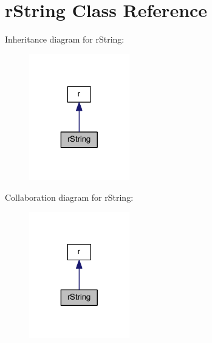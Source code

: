 \hypertarget{class_pierce_moore_1_1_ruby_p_h_p_1_1r_string}{\section{r\-String Class Reference}
\label{class_pierce_moore_1_1_ruby_p_h_p_1_1r_string}
}


Inheritance diagram for r\-String\-:
\nopagebreak
\begin{figure}[H]
\begin{center}
\leavevmode
\includegraphics[width=124pt]{class_pierce_moore_1_1_ruby_p_h_p_1_1r_string__inherit__graph}
\end{center}
\end{figure}


Collaboration diagram for r\-String\-:
\nopagebreak
\begin{figure}[H]
\begin{center}
\leavevmode
\includegraphics[width=124pt]{class_pierce_moore_1_1_ruby_p_h_p_1_1r_string__coll__graph}
\end{center}
\end{figure}
